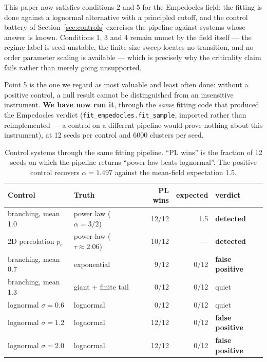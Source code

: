 \documentclass[11pt]{article}
\begin{document}
This paper now satisfies conditions 2 and 5 for the Empedocles field: the
fitting is done against a lognormal alternative with a principled cutoff, and
the control battery of Section~\ref{sec:controls} exercises the pipeline
against systems whose answer is known. Conditions 1, 3 and 4 remain unmet by
the field itself --- the regime label is seed-unstable, the finite-size sweep
locates no transition, and no order parameter scaling is available --- which is
precisely why the criticality claim fails rather than merely going unsupported.

Point 5 is the one we regard as most valuable and least often done: without
a positive control, a null result cannot be distinguished from an
insensitive instrument. \textbf{We have now run it}, through the \emph{same}
fitting code that produced the Empedocles verdict
(\texttt{fit\_empedocles.fit\_sample}, imported rather than
reimplemented --- a control on a different pipeline would prove nothing
about this instrument), at 12 seeds per control and 6000 clusters per seed.

\begin{table}[h]
\centering
\small
\begin{tabular}{llrrl}
\toprule
\textbf{Control} & \textbf{Truth} & \textbf{PL wins} & \textbf{expected} & \textbf{verdict} \\
\midrule
branching, mean 1.0   & power law ($\alpha=3/2$) & 12/12 & 1.5   & \textbf{detected} \\
2D percolation $p_c$  & power law ($\tau\approx2.06$) & 10/12 & --- & \textbf{detected} \\
\midrule
branching, mean 0.7   & exponential & 9/12  & 0/12 & \textbf{false positive} \\
branching, mean 1.3   & giant + finite tail & 0/12 & 0/12 & quiet \\
lognormal $\sigma=0.6$ & lognormal & 0/12 & 0/12 & quiet \\
lognormal $\sigma=1.2$ & lognormal & 12/12 & 0/12 & \textbf{false positive} \\
lognormal $\sigma=2.0$ & lognormal & 12/12 & 0/12 & \textbf{false positive} \\
\bottomrule
\end{tabular}
\caption{Control systems through the same fitting pipeline. ``PL wins'' is
the fraction of 12 seeds on which the pipeline returns ``power law beats
lognormal''. The positive control recovers $\alpha = 1.497$ against the
mean-field expectation 1.5.}
\label{tab:controls}
\end{table}
\end{document}
